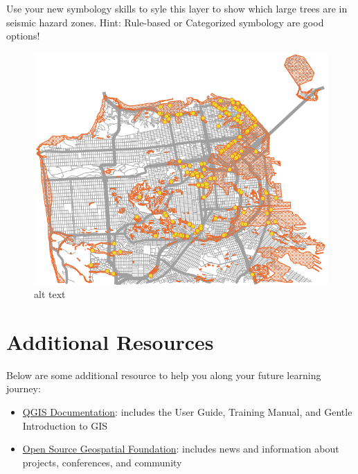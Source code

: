 \documentclass[
]{article}
\providecommand{\tightlist}{%
  \setlength{\itemsep}{0pt}\setlength{\parskip}{0pt}}
\begin{document}
Use your new symbology skills to syle this layer to show which large trees are in seismic hazard zones. Hint: Rule-based or Categorized symbology are good options!

\begin{figure}
\centering
\includegraphics{./images/Map_BigTreesInZone.PNG}
\caption{alt text}
\end{figure}

\hypertarget{additional-resources}{%
\section{Additional Resources}\label{additional-resources}}

Below are some additional resource to help you along your future learning journey:

\begin{itemize}
\tightlist
\item
  \href{https://qgis.org/en/docs/index.html}{QGIS Documentation}: includes the User Guide, Training Manual, and Gentle Introduction to GIS
\item
  \href{https://www.osgeo.org/}{Open Source Geospatial Foundation}: includes news and information about projects, conferences, and community
\end{itemize}
\end{document}

